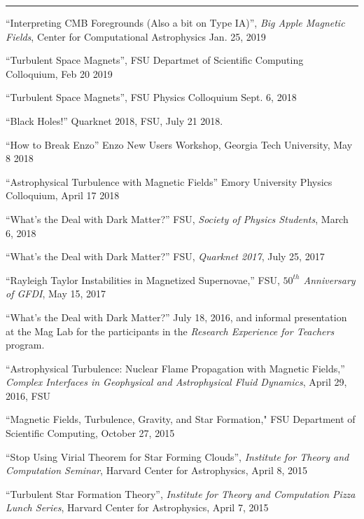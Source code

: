 
\medskip
{}\rule[3pt]{363pt}{.1mm}

\medskip
\noindent
``Interpreting CMB Foregrounds (Also a bit on Type IA)'', \emph{Big Apple
Magnetic Fields}, Center for Computational Astrophysics
Jan. 25, 2019

\medskip
\noindent
``Turbulent Space Magnets'', FSU Departmet of Scientific Computing Colloquium,
Feb 20 2019

\medskip
\noindent
``Turbulent Space Magnets'', FSU Physics Colloquium
Sept. 6, 2018

\medskip
\noindent
``Black Holes!'' Quarknet 2018, FSU, July 21 2018.

\medskip
\noindent

``How to Break Enzo'' Enzo New Users Workshop, Georgia Tech University, May 8
2018

\medskip
\noindent

``Astrophysical Turbulence with Magnetic Fields'' Emory University Physics
Colloquium, April 17 2018

\medskip
\noindent
``What’s the Deal with Dark Matter?'' FSU, {\it Society of Physics Students},
March 6, 2018

\medskip
\noindent
``What’s the Deal with Dark Matter?'' FSU, {\it Quarknet 2017}, July 25, 2017

\medskip
\noindent
``Rayleigh Taylor Instabilities in Magnetized Supernovae,'' FSU, {\it $50^{th}$
Anniversary of GFDI}, May 15, 2017

\medskip
\noindent
``What’s the Deal with Dark Matter?'' July 18, 2016, and informal presentation
 at the Mag Lab for the participants in the \emph{Research Experience for
Teachers} program.

\medskip
\noindent
``Astrophysical Turbulence: Nuclear Flame Propagation with Magnetic Fields,''
{\it Complex Interfaces in Geophysical and Astrophysical Fluid Dynamics}, April 29,
2016, FSU


\medskip
\noindent
``Magnetic Fields, Turbulence, Gravity, and Star Formation," FSU Department of
Scientific Computing, October 27, 2015

\medskip
\noindent
``Stop Using Virial Theorem for Star Forming Clouds'',
{\it Institute for Theory and Computation Seminar}, Harvard Center
for Astrophysics,  April 8, 2015

\medskip
\noindent
``Turbulent Star Formation Theory'',
{\it Institute for Theory and Computation Pizza Lunch Series}, Harvard Center
for Astrophysics,  April 7, 2015

